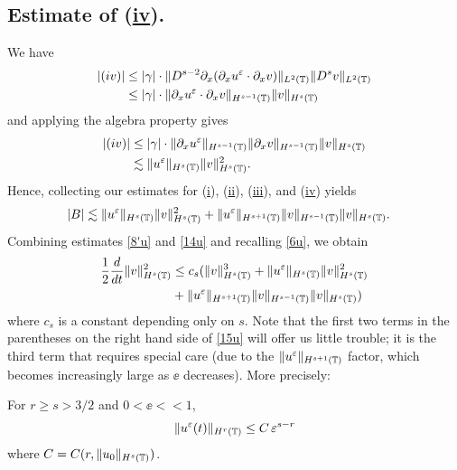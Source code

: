 \subsection{Estimate of (\hyperref[8u]{iv}).} We have
\begin{equation*}
\begin{split}
|(iv)|
& \le |\gamma| \cdot \|D^{s-2} \partial_x (\partial_x u^\varepsilon \cdot \partial_x v)
\|_{L^2(\mathbb{T})} \|D^s v\|_{L^2(\mathbb{T})}
\\
& \le |\gamma| \cdot \|\partial_x u^\varepsilon \cdot \partial_x v \|_{H^{s-1}(\mathbb{T})}
\|v\|_{H^s(\mathbb{T})}
\end{split}
\end{equation*}
and applying the algebra property gives
\begin{equation*}
\begin{split}
|(iv)|
& \le |\gamma| \cdot \|\partial_x u^\varepsilon \|_{H^{s-1}(\mathbb{T})} \|\partial_x v
\|_{H^{s-1}(\mathbb{T})} \|v\|_{H^s(\mathbb{T})}
\\
& \lesssim \|u^\varepsilon\|_{H^s(\mathbb{T})} \|v\|_{H^s(\mathbb{T})}^2.
\end{split}
\end{equation*}
Hence, collecting our estimates for (\hyperref[8u]{i}),
(\hyperref[8u]{ii}), (\hyperref[8u]{iii}), and (\hyperref[8u]{iv})
yields
\begin{equation}
\begin{split}
|B| 
& \lesssim
\|u^\varepsilon\|_{H^s(\mathbb{T})}
\|v\|_{H^s(\mathbb{T})}^2 + \|u^\varepsilon\|_{H^{s+1}(\mathbb{T})}
\|v\|_{H^{s-1}(\mathbb{T})} \|v\|_{H^s(\mathbb{T})}.
\label{14u}
\end{split}
\end{equation}
Combining estimates \eqref{8'u} and \eqref{14u} and recalling
\eqref{6u}, we obtain
\begin{equation}
\begin{split}
\frac{1}{2}\frac{d}{dt}\|v\|_{H^{s}(\mathbb{T})}^2
& \le c_s(\|v\|_{H^s(\mathbb{T})}^3 + \|u^\varepsilon\|_{H^s(\mathbb{T})}
\|v\|_{H^s(\mathbb{T})}^2
\\
& + \|u^\varepsilon\|_{H^{s+1}(\mathbb{T})}
\|v\|_{H^{s-1}(\mathbb{T})} \|v\|_{H^s(\mathbb{T})})
\label{15u}
\end{split}
\end{equation}
where $c_s$ is a constant depending only on $s$.
Note that the first two terms in the parentheses on the right hand side
of \eqref{15u} will offer us little trouble;
it is the third term that requires special care (due to the
$\|u^\varepsilon\|_{H^{s+1}(\mathbb{T})}$ factor, which becomes increasingly large as
$\ee$ decreases). More precisely:
%
%
%
\begin{remark}
\label{lem5r}
For $r \ge s > 3/2$ and $0 < \ee <<1$, 
\begin{equation}
\begin{split}
\|u^{\varepsilon} (t) \|_{H^r(\mathbb{T})} \le C \, \varepsilon^{s-r}
\label{700r}
\end{split}
\end{equation}
where $C = C(r, \|u_0\|_{H^s(\mathbb{T})})$.
\end{remark}	
